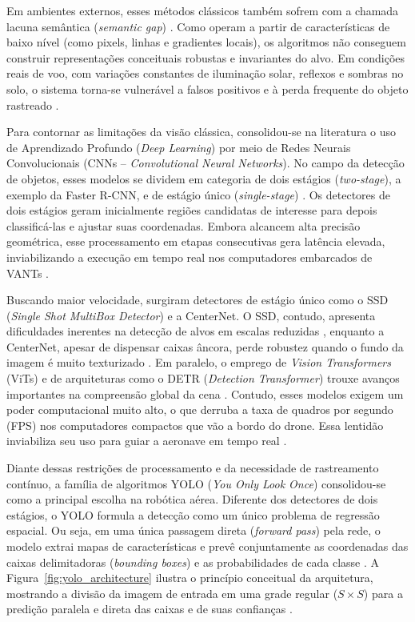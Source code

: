 Em ambientes externos, esses métodos clássicos também sofrem com a chamada lacuna semântica (\textit{semantic gap}) \cite{zhao2019}. Como operam a partir de características de baixo nível (como pixels, linhas e gradientes locais), os algoritmos não conseguem construir representações conceituais robustas e invariantes do alvo. Em condições reais de voo, com variações constantes de iluminação solar, reflexos e sombras no solo, o sistema torna-se vulnerável a falsos positivos e à perda frequente do objeto rastreado \cite{zhao2019}.

Para contornar as limitações da visão clássica, consolidou-se na literatura o uso de Aprendizado Profundo (\textit{Deep Learning}) por meio de Redes Neurais Convolucionais (CNNs -- \textit{Convolutional Neural Networks}). No campo da detecção de objetos, esses modelos se dividem em categoria de dois estágios (\textit{two-stage}), a exemplo da Faster R-CNN, e de estágio único (\textit{single-stage}) \cite{zhao2019, amjoud2023, terven2023}. Os detectores de dois estágios geram inicialmente regiões candidatas de interesse para depois classificá-las e ajustar suas coordenadas. Embora alcancem alta precisão geométrica, esse processamento em etapas consecutivas gera latência elevada, inviabilizando a execução em tempo real nos computadores embarcados de VANTs \cite{amjoud2023}.

Buscando maior velocidade, surgiram detectores de estágio único como o SSD (\textit{Single Shot MultiBox Detector}) e a CenterNet. O SSD, contudo, apresenta dificuldades inerentes na detecção de alvos em escalas reduzidas \cite{amjoud2023}, enquanto a CenterNet, apesar de dispensar caixas âncora, perde robustez quando o fundo da imagem é muito texturizado \cite{xiuling2024}. Em paralelo, o emprego de \textit{Vision Transformers} (ViTs) e de arquiteturas como o DETR (\textit{Detection Transformer}) trouxe avanços importantes na compreensão global da cena \cite{amjoud2023}. Contudo, esses modelos exigem um poder computacional muito alto, o que derruba a taxa de quadros por segundo (FPS) nos computadores compactos que vão a bordo do drone. Essa lentidão inviabiliza seu uso para guiar a aeronave em tempo real \cite{rawat2026}.

Diante dessas restrições de processamento e da necessidade de rastreamento contínuo, a família de algoritmos YOLO (\textit{You Only Look Once}) consolidou-se como a principal escolha na robótica aérea. Diferente dos detectores de dois estágios, o YOLO formula a detecção como um único problema de regressão espacial. Ou seja, em uma única passagem direta (\textit{forward pass}) pela rede, o modelo extrai mapas de características e prevê conjuntamente as coordenadas das caixas delimitadoras (\textit{bounding boxes}) e as probabilidades de cada classe \cite{amjoud2023, afifah2025}. A Figura~\ref{fig:yolo_architecture} ilustra o princípio conceitual da arquitetura, mostrando a divisão da imagem de entrada em uma grade regular ($S \times S$) para a predição paralela e direta das caixas e de suas confianças \cite{redmon2016}.


